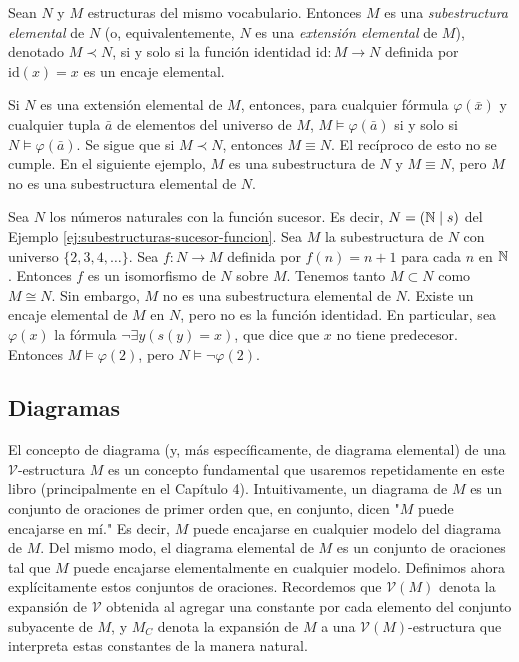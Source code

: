 \documentclass[12pt,a4paper]{book}
\newcommand{\comillas}[1]{"#1"}
\newcommand{\VV}{\mathcal{V}}
\begin{document}
    \begin{definicion}\label{def:subestructura-elemental}
        Sean $N$ y $M$ estructuras del mismo vocabulario. Entonces $M$ es una \textit{subestructura elemental} de $N$ (o,
        equivalentemente, $N$ es una \textit{extensión elemental} de $M$), denotado $M\prec N$, si y solo si la función
        identidad $\mathrm{id}:M\rightarrow N$ definida por $\mathrm{id}(x)=x$ es un encaje elemental.
    \end{definicion}

    Si $N$ es una extensión elemental de $M$, entonces, para cualquier fórmula $\varphi(\bar{x})$ y cualquier tupla
    $\bar{a}$ de elementos del universo de $M$, $M\models\varphi(\bar{a})$ si y solo si $N\models\varphi(\bar{a})$. Se
    sigue que si $M\prec N$, entonces $M\equiv N$. El recíproco de esto no se cumple. En el siguiente ejemplo, $M$ es una
    subestructura de $N$ y $M\equiv N$, pero $M$ no es una subestructura elemental de $N$.

    \begin{ejemplo}\label{ej:subestructura-no-elemental}
        Sea $N$ los números naturales con la función sucesor. Es decir, $N=(\mathbb{N}\mid s)$ del Ejemplo
        \ref{ej:subestructuras-sucesor-funcion}. Sea $M$ la subestructura de $N$ con universo $\{2,3,4,\dots\}$. Sea
        $f:N\rightarrow M$ definida por $f(n)=n+1$ para cada $n$ en $\mathbb{N}$. Entonces $f$ es un isomorfismo de $N$ sobre $M$.
        Tenemos tanto $M\subset N$ como $M\cong N$. Sin embargo, $M$ no es una subestructura elemental de $N$. Existe un
        encaje elemental de $M$ en $N$, pero no es la función identidad. En particular, sea $\varphi(x)$ la fórmula
        $\neg\exists y(s(y)=x)$, que dice que $x$ no tiene predecesor. Entonces $M\models\varphi(2)$, pero
        $N\models\neg\varphi(2)$.
    \end{ejemplo}

    \subsection{Diagramas}

    El concepto de diagrama (y, más específicamente, de diagrama elemental) de una $\VV$-estructura $M$ es un concepto
    fundamental que usaremos repetidamente en este libro (principalmente en el Capítulo 4). Intuitivamente, un diagrama de
    $M$ es un conjunto de oraciones de primer orden que, en conjunto, dicen \comillas{$M$ puede encajarse en mí.} Es
    decir, $M$ puede encajarse en cualquier modelo del diagrama de $M$. Del mismo modo, el diagrama elemental de $M$ es un
    conjunto de oraciones tal que $M$ puede encajarse elementalmente en cualquier modelo. Definimos ahora explícitamente
    estos conjuntos de oraciones. Recordemos que $\VV(M)$ denota la expansión de $\VV$ obtenida al agregar una constante
    por cada elemento del conjunto subyacente de $M$, y $M_{C}$ denota la expansión de $M$ a una $\VV(M)$-estructura que
    interpreta estas constantes de la manera natural.
\end{document}
